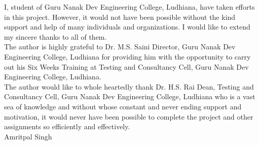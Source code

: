 \begin{Large}
\end{Large}

I, student of Guru Nanak Dev Engineering College, Ludhiana, have taken efforts in this project.
However, it would not have been possible without the kind support and help of many individuals
and organizations. I would like to extend my sincere thanks to all of them.\\

The author is highly grateful to Dr. M.S. Saini Director, Guru Nanak Dev Engineering College, Ludhiana for providing him with the opportunity to carry out his Six Weeks Training at
Testing and Consultancy Cell, Guru Nanak Dev Engineering College, Ludhiana.\\

The author would like to whole heartedly thank Dr. H.S. Rai Dean, Testing and Consultancy
Cell, Guru Nanak Dev Engineering College, Ludhiana who is a vast sea of knowledge and without whose constant and never ending support and motivation, it would never have been possible to complete the project and other assignments so efficiently and effectively.\\






\vskip 1.0cm 
\noindent Amritpal Singh
